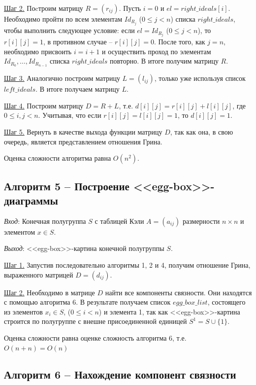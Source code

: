 \documentclass[bachelor, och, labwork]{shiza}
\begin{document}
    \underline{Шаг 2.}  Поcтроим матрицу $R = (r_{ij})$. Пусть $i = 0$ и $el = right\_ideals[i]$. Необходимо пройти по всем элементам $Id_{R_j}$ ($0 \leq j < n$)
    списка $right\_ideals$, чтобы выполнить следующее условие: если $el = Id_{R_j}$ ($0 \leq j < n$), то $r[i][j] = 1$, в противном случае -- $r[i][j] = 0$.
    После того, как $j = n$, необходимо присвоить $i = i + 1$ и осуществить проход по элементам $Id_{R_0}, \dots, Id_{R_{n-1}}$ списка $right\_ideals$ повторно.
    В итоге получим матрицу $R$.
    
    \underline{Шаг 3.} Аналогично построим матрицу $L = (l_{ij})$, только уже используя список $left\_ideals$. В итоге получаем матрицу $L$.

    \underline{Шаг 4.} Построим матрицу $D = R + L$, т.е. $d[i][j] = r[i][j] + l[i][j]$, где $0 \leq i, j < n$. Учитывая, что если $r[i][j] = l[i][j] = 1$,
    то $d[i][j] = 1$.

    \underline{Шаг 5.} Вернуть в качестве выхода функции матрицу $D$, так как она, в свою очередь, является представлением отношения Грина.
    
      Оценка сложности алгоритма равна $O(n^2)$.


    \subsection{Алгоритм 5 -- Построение <<egg-box>>-диаграммы}

      \textit{Вход}: Конечная полугруппа $S$ с таблицей Кэли $A = (a_{ij})$ размерности $n \times n$ и элементом $x \in S$.

      \textit{Выход}: <<egg-box>>-картина конечной полугруппы $S$.
      
      \underline{Шаг 1.} Запустив последовательно алгоритмы 1, 2 и 4, получим отношение Грина, выраженного матрицей $D = (d_{ij})$.

      \underline{Шаг 2.} Необходимо в матрице $D$ найти все компоненты связности. Они находятся с помощью алгоритма 6. В результате получаем
      список $egg\_box\_list$, состоящего из элементов $x_i \in S$, ($0 \leq i < n$) и элемента 1, так как <<egg-box>>-картина строится по полугруппе
      с внешне присоединенной единицей $S^1 = S \cup \{1\}$.

      Оценка сложности равна оценке сложность алгоритма 6, т.е. $O(n + n) = O(n)$


      \subsection{Алгоритм 6 -- Нахождение компонент связности}
\end{document}
